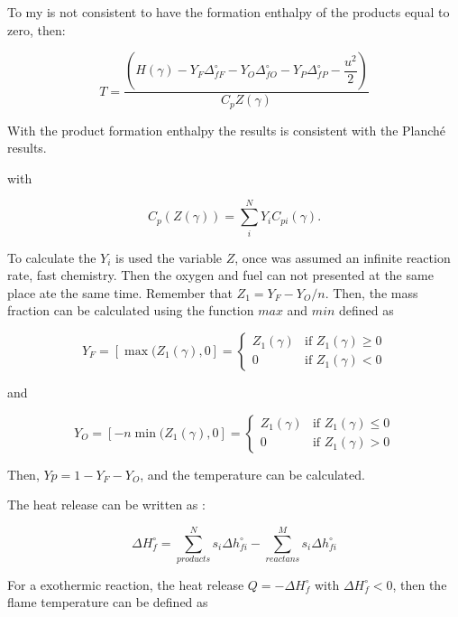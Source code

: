 {\color{red}To my  is not consistent to have the formation enthalpy of the products equal to zero, then:

\begin{equation}
T
=
\frac{\left(    
    H(\gamma)
    -
    Y_F
    \Delta^{\circ}_{fF}
    -
    Y_O
    \Delta^{\circ}_{fO}
    -
    Y_P
    \Delta^{\circ}_{fP}
    -
    \dfrac{u^2}{2}
\right)}
{C_pZ(\gamma)}
\end{equation}


With the product formation enthalpy the results is consistent with the Planché results. 
}

with 

\begin{equation}
C_p(Z(\gamma))
=
\sum_i^N
Y_i
C_{pi}(\gamma)
.
\end{equation}

To calculate the $Y_i$ is used the variable $Z$, once was assumed
an infinite reaction rate, fast chemistry. 
Then the oxygen and fuel can not presented at the same place ate the same time.
Remember that $Z_1=Y_F-Y_O/n$.  Then, the mass fraction can be calculated using
the function $max$ and $min$ defined as  

\begin{equation}
Y_F=
[\max(Z_1(\gamma), 0] 
= 
\begin{cases} Z_1(\gamma) & \text{if } Z_1(\gamma) \geq 0 \\ 0 & \text{if }  Z_1(\gamma) < 0 \end{cases}    
\end{equation}

and 

\begin{equation}
Y_O=
[-n\min(Z_1(\gamma), 0]
= 
\begin{cases} Z_1(\gamma) & \text{if } Z_1(\gamma) \leq 0 \\ 0 & \text{if }  Z_1(\gamma) > 0 
\end{cases}    
\end{equation}

Then, $Yp=1-Y_F-Y_O$, and the temperature can be calculated. 

The heat release can be written as :

\begin{equation*}
    \Delta H_f^{\circ} =\sum_{products}^Ns_i\Delta h_{fi}^{\circ}-\sum_{reactans}^Ms_i\Delta h_{fi}^{\circ}    
\end{equation*}

For a exothermic reaction, the heat release  $Q=-\Delta H_f^{\circ}$  with $\Delta H_f^{\circ}<0$, then the flame temperature can be defined as 

